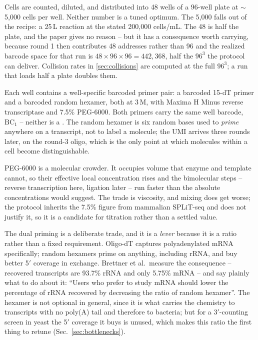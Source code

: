  Cells are counted, diluted,
and distributed into 48 wells of a 96-well plate at $\sim$5{,}000 cells per well.
Neither number is a tuned optimum. The 5{,}000 falls out of the recipe: a
25\,\textmu L reaction at the stated 200{,}000 cells/mL. The 48 is half the plate,
and the paper gives no reason -- but it has a consequence worth carrying, because
round 1 then contributes 48 addresses rather than 96 and the realized barcode
space for that run is $48\times96\times96=442{,}368$, half the $96^3$ the protocol
can deliver. Collision rates in \cref{sec:collisions} are computed at the full
$96^3$; a run that loads half a plate doubles them.

Each well contains a well-specific barcoded primer pair: a barcoded 15-dT primer
and a barcoded random hexamer, both at 3\,\textmu M, with Maxima H Minus reverse
transcriptase and 7.5\% PEG-6000. Both primers carry the same well barcode,
$\mathrm{BC}_1$ -- neither is a . The random
hexamer is six random bases used to \emph{prime} anywhere on a transcript, not to
label a molecule; the UMI arrives three rounds later, on the round-3 oligo, which
is the only point at which molecules within a cell become distinguishable.

PEG-6000 is a molecular crowder. It occupies volume that enzyme and template
cannot, so their effective local concentration rises and the bimolecular steps -- reverse transcription here, ligation later -- run faster than the absolute
concentrations would suggest. The trade is viscosity, and mixing does get worse;
the protocol inherits the 7.5\% figure from mammalian SPLiT-seq and does not
justify it, so it is a candidate for titration rather than a settled value.

The dual priming is a deliberate trade, and it is a \emph{lever} because it is a
ratio rather than a fixed requirement. Oligo-dT captures polyadenylated mRNA
specifically; random hexamers prime on anything, including rRNA, and buy better
5$'$ coverage in exchange. Brettner et al.\ measure the consequence -- recovered
transcripts are 93.7\% rRNA and only 5.75\% mRNA -- and say plainly what to do
about it: ``Users who prefer to study mRNA should lower the percentage of rRNA
recovered by decreasing the ratio of random hexamer''. The hexamer is not
optional in general, since it is what carries the chemistry to transcripts with no
poly(A) tail and therefore to bacteria; but for a 3$'$-counting screen in yeast
the 5$'$ coverage it buys is unused, which makes this ratio the first thing to
retune (Sec.~\ref{sec:bottlenecks}).

